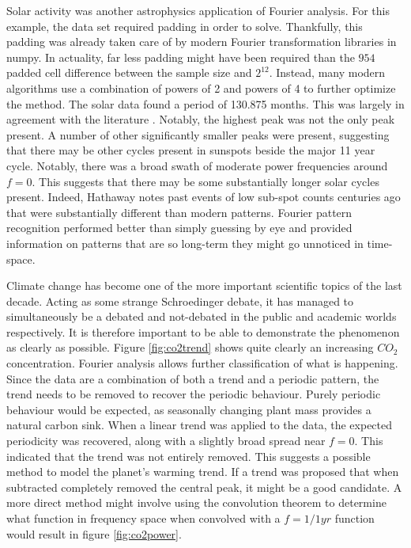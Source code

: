 \documentclass[twocolumn]{article}
\begin{document}
Solar activity was another astrophysics application of Fourier analysis. For this example, the data set required padding in order to solve. Thankfully, this padding was already taken care of by modern Fourier transformation libraries in numpy. In actuality, far less padding might have been required than the $954$ padded cell difference between the sample size and $2^{12}$. Instead, many modern algorithms use a combination of powers of 2 and powers of 4 to further optimize the method. The solar data found a period of 130.875 months. This was largely in agreement with the literature \cite{sunspots}. Notably, the highest peak was not the only peak present. A number of other significantly smaller peaks were present, suggesting that there may be other cycles present in sunspots beside the major 11 year cycle. Notably, there was a broad swath of moderate power frequencies around $f=0$. This suggests that there may be some substantially longer solar cycles present. Indeed, Hathaway \cite{sunspots} notes past events of low sub-spot counts centuries ago that were substantially different than modern patterns. Fourier pattern recognition performed better than simply guessing by eye and provided information on patterns that are so long-term they might go unnoticed in time-space.

Climate change has become one of the more important scientific topics of the last decade. Acting as some strange Schroedinger debate, it has managed to simultaneously be a debated and not-debated in the public and academic worlds respectively. It is therefore important to be able to demonstrate the phenomenon as clearly as possible. Figure \ref{fig:co2trend} shows quite clearly an increasing $CO_2$ concentration. Fourier analysis allows further classification of what is happening. Since the data are a combination of both a trend and a periodic pattern, the trend needs to be removed to recover the periodic behaviour. Purely periodic behaviour would be expected, as seasonally changing plant mass provides a natural carbon sink. When a linear trend was applied to the data, the expected periodicity was recovered, along with a slightly broad spread near $f=0$. This indicated that the trend was not entirely removed. This suggests a possible method to model the planet's warming trend. If a trend was proposed that when subtracted completely removed the central peak, it might be a good candidate. A more direct method might involve using the convolution theorem to determine what function in frequency space when convolved with a $f=1/1yr$ function would result in figure \ref{fig:co2power}.
\end{document}
